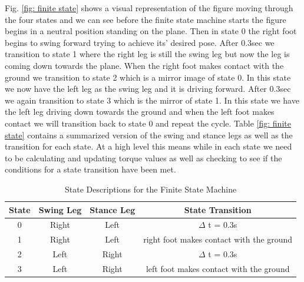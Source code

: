 \documentclass[12pt, a4paper]{article}
\begin{document}
Fig. \ref{fig: finite state} shows a visual representation of the figure moving through the four states and we can see before the finite state machine starts the figure begins in a neutral position standing on the plane. Then in state 0 the right foot begins to swing forward trying to achieve its' desired pose. After 0.3sec we transition to state 1 where the right leg is still the swing leg but now the leg is coming down towards the plane. When the right foot makes contact with the ground we transition to state 2 which is a mirror image of state 0. In this state we now have the left leg as the swing leg and it is driving forward. After 0.3sec we again transition to state 3 which is the mirror of state 1. In this state we have the left leg driving down towards the ground and when the left foot makes contact we will transition back to state 0 and repeat the cycle. Table \ref{fig: finite state} contains a summarized version of the swing and stance legs as well as the transition for each state. At a high level this means while in each state we need to be calculating and updating torque values as well as checking to see if the conditions for a state transition have been met.

\begin{table}[ht]
\caption{State Descriptions for the Finite State Machine}
\begin{center}
\begin{tabular}{|c|c|c|c|}
\hline
State& Swing Leg & Stance Leg& State Transition\\
\hline 
0& Right & Left&  $\Delta$ t = 0.3s\\
\hline
1 &  Right& Left & right foot makes contact with the ground\\
\hline
2 &  Left & Right & $\Delta$ t = 0.3s\\
\hline
3 & Left& Right& left foot makes contact with the ground\\
\hline
\end{tabular}
\end{center}
\label{tbl:state descriptions}
\end{table}
\end{document}
